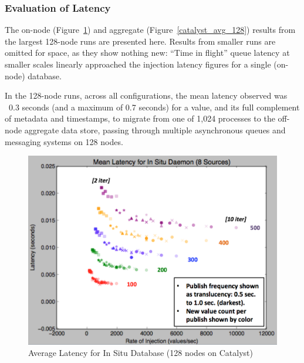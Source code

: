 \subsubsection{Evaluation of Latency} %
%
The on-node (Figure~\ref{catalyst_avg_node}) and aggregate
(Figure~\ref{catalyst_avg_128}) results from the largest 128-node runs
are presented here.
%
Results from smaller runs are omitted for space, as they show nothing
new: ``Time in flight'' queue latency at smaller scales linearly
approached the injection latency figures for a single (on-node)
database.
%
\par
%
In the 128-node runs, across all configurations, the mean latency
observed was ~0.3 seconds (and a maximum of 0.7 seconds) for a value,
and its full complement of metadata and timestamps, to migrate from
one of 1,024 processes to the off-node aggregate data store, passing
through multiple asynchronous queues and messaging systems on 128
nodes.
%

\begin{figure}[h]
\centering
\includegraphics[width=\columnwidth]{images/avg_node.png}
\caption{Average Latency for In Situ Database (128 nodes on Catalyst)}
\label{catalyst_avg_node}
\end{figure}

